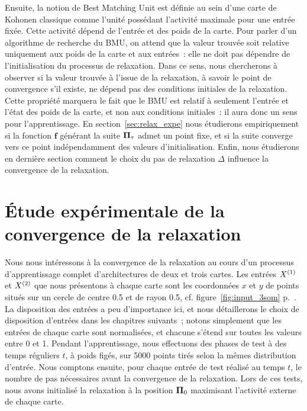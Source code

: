 \documentclass[../main]{subfiles}
\begin{document}
Ensuite, la notion de Best Matching Unit est définie au sein d'une carte de Kohonen classique comme l'unité possédant l'activité maximale pour une entrée fixée. 
Cette activité dépend de l'entrée et des poids de la carte.
Pour parler d'un algorithme de recherche du BMU, on attend que la valeur trouvée soit relative uniquement aux poids de la carte et aux entrées~: elle ne doit pas dépendre de l'initialisation du processus de relaxation.
Dans ce sens, nous chercherons à observer si la valeur trouvée à l'issue de la relaxation, à savoir le point de convergence s'il existe, ne dépend pas des conditions initiales de la relaxation.
Cette propriété marquera le fait que le BMU est relatif à seulement l'entrée et l'état des poids de la carte, et non aux conditions initiales~: il aura donc un sens pour l'apprentissage.
En section~\ref{sec:relax_expe} nous étudierons empiriquement si la fonction $\mathbf{f}$ générant la suite $\mathbf{\Pi}_\tau$ admet un point fixe, et si la suite converge vers ce point indépendamment des valeurs d'initialisation.
Enfin, nous étudierons en dernière section comment le choix du pas de relaxation $\Delta$ influence la convergence de la relaxation.

\section{\'Etude expérimentale de la convergence de la relaxation}\label{sec:relax_conv}

Nous nous intéressons à la convergence de la relaxation au cours d'un processus d'apprentissage complet d'architectures de deux et trois cartes. 
Les entrées $X^{({1})}$ et $X^{({2})}$ que nous présentons à chaque carte sont les coordonnées $x$ et $y$ de points situés sur un cercle de centre 0.5 et de rayon 0.5, cf. figure~\ref{fig:input_3som} p.~\pageref{fig:input_3som}. La disposition des entrées a peu d'importance ici, et nous détaillerons le choix de disposition d'entrées dans les chapitres suivants~; notons simplement que les entrées de chaque carte sont normalisées, et chacune s'étend sur toutes les valeurs entre 0 et 1.
Pendant l'apprentissage, nous effectuons des phases de test à des temps réguliers $t$, à poids figés, sur 5000 points tirés selon la mêmes distribution d'entrée. 
Nous comptons ensuite, pour chaque entrée de test réalisé au temps $t$, le nombre de pas nécessaires avant la convergence de la relaxation. Lors de ces tests, nous avons initialisé la relaxation à la position $\mathbf{\Pi}_0$ maximisant l'activité externe de chaque carte.
\end{document}
